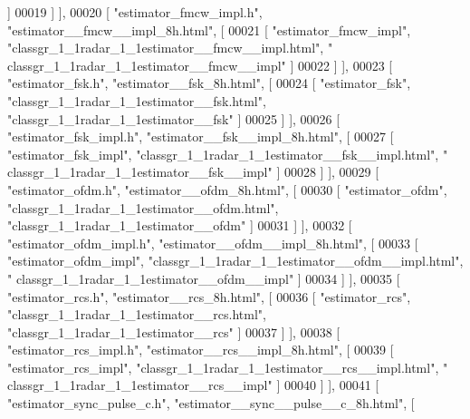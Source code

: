 \begin{DoxyCode}
       ]
00019     ] ],
00020     [ \textcolor{stringliteral}{"estimator\_fmcw\_impl.h"}, \textcolor{stringliteral}{"estimator\_\_fmcw\_\_impl\_8h.html"}, [
00021       [ \textcolor{stringliteral}{"estimator\_fmcw\_impl"}, \textcolor{stringliteral}{"classgr\_1\_1radar\_1\_1estimator\_\_fmcw\_\_impl.html"}, \textcolor{stringliteral}{"
      classgr\_1\_1radar\_1\_1estimator\_\_fmcw\_\_impl"} ]
00022     ] ],
00023     [ \textcolor{stringliteral}{"estimator\_fsk.h"}, \textcolor{stringliteral}{"estimator\_\_fsk\_8h.html"}, [
00024       [ \textcolor{stringliteral}{"estimator\_fsk"}, \textcolor{stringliteral}{"classgr\_1\_1radar\_1\_1estimator\_\_fsk.html"}, \textcolor{stringliteral}{"classgr\_1\_1radar\_1\_1estimator\_\_fsk"} ]
00025     ] ],
00026     [ \textcolor{stringliteral}{"estimator\_fsk\_impl.h"}, \textcolor{stringliteral}{"estimator\_\_fsk\_\_impl\_8h.html"}, [
00027       [ \textcolor{stringliteral}{"estimator\_fsk\_impl"}, \textcolor{stringliteral}{"classgr\_1\_1radar\_1\_1estimator\_\_fsk\_\_impl.html"}, \textcolor{stringliteral}{"
      classgr\_1\_1radar\_1\_1estimator\_\_fsk\_\_impl"} ]
00028     ] ],
00029     [ \textcolor{stringliteral}{"estimator\_ofdm.h"}, \textcolor{stringliteral}{"estimator\_\_ofdm\_8h.html"}, [
00030       [ \textcolor{stringliteral}{"estimator\_ofdm"}, \textcolor{stringliteral}{"classgr\_1\_1radar\_1\_1estimator\_\_ofdm.html"}, \textcolor{stringliteral}{"classgr\_1\_1radar\_1\_1estimator\_\_ofdm"}
       ]
00031     ] ],
00032     [ \textcolor{stringliteral}{"estimator\_ofdm\_impl.h"}, \textcolor{stringliteral}{"estimator\_\_ofdm\_\_impl\_8h.html"}, [
00033       [ \textcolor{stringliteral}{"estimator\_ofdm\_impl"}, \textcolor{stringliteral}{"classgr\_1\_1radar\_1\_1estimator\_\_ofdm\_\_impl.html"}, \textcolor{stringliteral}{"
      classgr\_1\_1radar\_1\_1estimator\_\_ofdm\_\_impl"} ]
00034     ] ],
00035     [ \textcolor{stringliteral}{"estimator\_rcs.h"}, \textcolor{stringliteral}{"estimator\_\_rcs\_8h.html"}, [
00036       [ \textcolor{stringliteral}{"estimator\_rcs"}, \textcolor{stringliteral}{"classgr\_1\_1radar\_1\_1estimator\_\_rcs.html"}, \textcolor{stringliteral}{"classgr\_1\_1radar\_1\_1estimator\_\_rcs"} ]
00037     ] ],
00038     [ \textcolor{stringliteral}{"estimator\_rcs\_impl.h"}, \textcolor{stringliteral}{"estimator\_\_rcs\_\_impl\_8h.html"}, [
00039       [ \textcolor{stringliteral}{"estimator\_rcs\_impl"}, \textcolor{stringliteral}{"classgr\_1\_1radar\_1\_1estimator\_\_rcs\_\_impl.html"}, \textcolor{stringliteral}{"
      classgr\_1\_1radar\_1\_1estimator\_\_rcs\_\_impl"} ]
00040     ] ],
00041     [ \textcolor{stringliteral}{"estimator\_sync\_pulse\_c.h"}, \textcolor{stringliteral}{"estimator\_\_sync\_\_pulse\_\_c\_8h.html"}, [

\end{DoxyCode}
